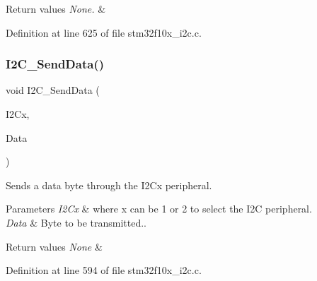 \begin{DoxyRetVals}{Return values}
{\em None.} & \\
\hline
\end{DoxyRetVals}


Definition at line 625 of file stm32f10x\+\_\+i2c.\+c.

\mbox{\label{group___i2_c___exported___functions_ga7bd9e70b8eafde0dd5eb42b0d95fe1a9}} 
\subsubsection{\texorpdfstring{I2\+C\+\_\+\+Send\+Data()}{I2C\_SendData()}}
{\footnotesize\ttfamily void I2\+C\+\_\+\+Send\+Data (\begin{DoxyParamCaption}\item[{\hyperlink{struct_i2_c___type_def}{I2\+C\+\_\+\+Type\+Def} $\ast$}]{I2\+Cx,  }\item[{uint8\+\_\+t}]{Data }\end{DoxyParamCaption})}



Sends a data byte through the I2\+Cx peripheral. 


\begin{DoxyParams}{Parameters}
{\em I2\+Cx} & where x can be 1 or 2 to select the I2C peripheral. \\
\hline
{\em Data} & Byte to be transmitted.. \\
\hline
\end{DoxyParams}

\begin{DoxyRetVals}{Return values}
{\em None} & \\
\hline
\end{DoxyRetVals}


Definition at line 594 of file stm32f10x\+\_\+i2c.\+c.

\mbox{\label{group___i2_c___exported___functions_ga75a810776d9710d2f6d9c5d9e93241c6}} 

